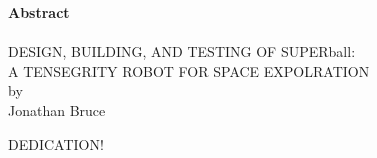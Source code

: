 \documentclass[11pt,oneside,a4paper,onecolumn]{article}                 %
\begin{document}

\listoftables %
\pagebreak[4]


\thispagestyle{empty} %
\begin{center}
{\bf Abstract}\\
\ \\
DESIGN, BUILDING, AND TESTING OF SUPERball:\\ A TENSEGRITY ROBOT FOR SPACE EXPOLRATION\\
by\\
Jonathan Bruce\\
\end{center}



\pagebreak[4]




DEDICATION!
\end{document}
